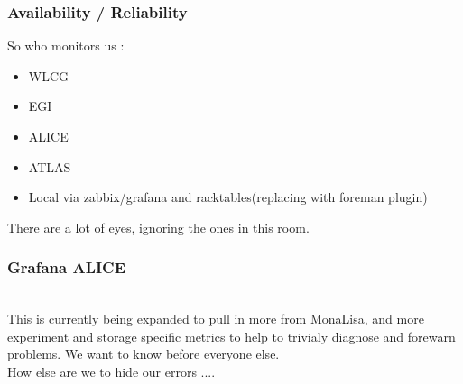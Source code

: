 \documentclass{beamer}
\begin{document}
\begin{frame}
  \frametitle{Availability / Reliability}
  So who monitors us :
  \begin{itemize}
    \item WLCG
    \item EGI
    \item ALICE
    \item ATLAS
    \item Local via zabbix/grafana and racktables(replacing with foreman plugin)
  \end{itemize}
There are a lot of eyes, ignoring the ones in this room.\\
\vspace{0.5cm}
\vspace{0.5cm}
\end{frame}

\begin{frame}
  \frametitle{Grafana ALICE}
  \\
  This is currently being expanded to pull in more from MonaLisa, and more experiment and storage specific
  metrics to help to trivialy diagnose and forewarn problems. We want to know before everyone else.\\
    How else are we to hide our errors ....
\end{frame}
\end{document}
